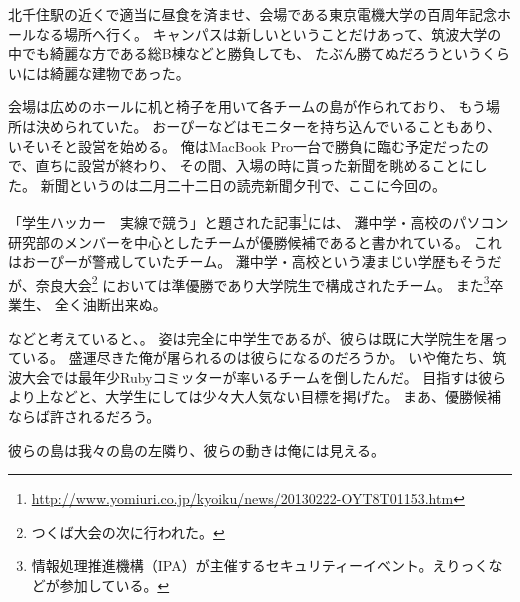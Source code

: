 北千住駅の近くで適当に昼食を済ませ、会場である東京電機大学の百周年記念ホールなる場所へ行く。
キャンパスは新しいということだけあって、筑波大学の中でも綺麗な方である総B棟などと勝負しても、
たぶん勝てぬだろうというくらいには綺麗な建物であった。

会場は広めのホールに机と椅子を用いて各チームの島が作られており、
もう場所は決められていた。
おーぴーなどはモニターを持ち込んでいることもあり、いそいそと設営を始める。
俺はMacBook Pro一台で勝負に臨む予定だったので、直ちに設営が終わり、
その間、入場の時に貰った新聞を眺めることにした。
新聞というのは二月二十二日の読売新聞夕刊で、ここに今回の。

「学生ハッカー　実線で競う」と題された記事\footnote{\url{http://www.yomiuri.co.jp/kyoiku/news/20130222-OYT8T01153.htm}}には、
灘中学・高校のパソコン研究部のメンバーを中心としたチームが優勝候補であると書かれている。
これはおーぴーが警戒していたチーム\ED。
灘中学・高校という凄まじい学歴もそうだが、奈良大会\footnote{つくば大会の次に行われた。}
においては準優勝であり大学院生で構成されたチーム。
また\footnote{情報処理推進機構（IPA）が主催するセキュリティーイベント。えりっくなどが参加している。}卒業生、
全く油断出来ぬ。

などと考えていると、。
姿は完全に中学生であるが、彼らは既に大学院生を屠っている。
盛運尽きた俺が屠られるのは彼らになるのだろうか。
いや俺たち、筑波大会では最年少Rubyコミッターが率いるチームを倒したんだ。
目指すは彼らより上などと、大学生にしては少々大人気ない目標を掲げた。
まあ、優勝候補ならば許されるだろう。

彼らの島は我々の島の左隣り、彼らの動きは俺には見える。

